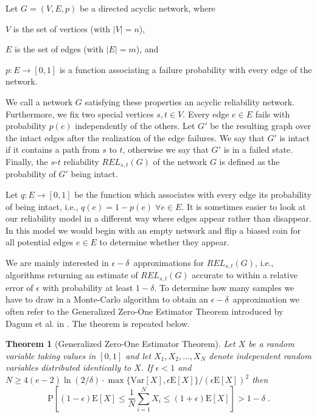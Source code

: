 \documentclass{article}
\newtheorem{theorem}{Theorem}
\newcommand\ex{\mathrm{E}}
\newcommand\prob{\mathrm{P}}
\newcommand\var{\mathrm{Var}}
\begin{document}
Let $G=(V,E,p)$ be a directed acyclic network, where
\begin{compactitem}
\item $V$ is the set of vertices (with $|V|=n$),
\item $E$ is the set of edges (with $|E|=m$), and
\item $p:E\longrightarrow [0,1]$ is a function associating
  a failure probability with every edge of the network.
\end{compactitem}

We call a network $G$ satisfying these properties an acyclic
reliability network.
Furthermore, we fix two special vertices $s,t \in V$. Every
edge $e\in E$ fails with probability
$p(e)$ independently of the others. Let $G'$ be the
resulting graph over the intact edges after the realization of the edge failures.
We say that $G'$ is
intact if it contains a path from $s$ to $t$,
otherwise we say that $G'$ is in a failed state.
Finally, the $s$-$t$ reliability $\mathit{REL}_{s,t}(G)$  of the
network $G$ is defined as the probability of $G'$ being
intact.

Let $q:E\longrightarrow [0,1]$ be the function which
associates with every edge its probability of being intact,
i.e., $q(e)=1-p(e) \;\forall e\in E$. It is sometimes easier
to look at our reliability model in a different way where edges
appear rather than disappear. In this model we would begin
with an empty network and flip a biased coin for all
potential edges $e\in E$ to determine whether they appear.

We are mainly interested in $\epsilon-\delta$~approximations
for $\mathit{REL}_{s,t}(G)$, i.e., algorithms
returning an estimate of $\mathit{REL}_{s,t}(G)$ accurate to
within a relative error of $\epsilon$ with probability
at least $1-\delta$.
To determine how many samples we have to draw in a
\mbox{Monte-Carlo} algorithm to obtain an $\epsilon-\delta$~approximation
we often refer to the Generalized \mbox{Zero-One} Estimator Theorem
introduced by Dagum et al. in \cite{dagum_2000_optimal}. The theorem is repeated
below.

\begin{theorem}[Generalized Zero-One Estimator Theorem]\label{thm:generalized_01_thm}
Let $X$ be a random variable taking values in $[0,1]$ and let
$X_1,X_2,\dots,X_N$ denote independent random variables distributed
identically to $X$. If
$\epsilon<1$ and
$N\geq 4(e-2)\ln(2/\delta)\cdot \max\{\var[X],\epsilon\ex[X]\}/(\epsilon\ex[X])^2$
then
\begin{equation*}
\prob\left[(1-\epsilon)\ex[X]\leq\frac{1}{N}\sum_{i=1}^N X_i\leq(1+\epsilon)\ex[X]\right]>1-\delta\;.
\end{equation*}
\end{theorem}
\end{document}
